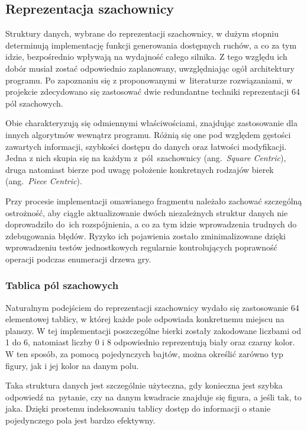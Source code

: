 \subsection{Reprezentacja szachownicy}
\label{subsec:reprezentacja-szachownicy}

Struktury danych, wybrane do reprezentacji szachownicy, w dużym stopniu determinują implementację funkcji generowania dostępnych ruchów, a co za tym idzie, bezpośrednio wpływają na wydajność całego silnika.
Z tego względu ich dobór musiał zostać odpowiednio zaplanowany, uwzględniając ogół architektury programu.
Po zapoznaniu się z proponowanymi w~literaturze rozwiązaniami, w projekcie zdecydowano się zastosować dwie redundantne techniki reprezentacji 64 pól szachowych.

Obie charakteryzują się odmiennymi właściwościami, znajdując zastosowanie dla innych algorytmów wewnątrz programu.
Różnią się one pod względem gęstości zawartych informacji, szybkości dostępu do danych oraz łatwości modyfikacji.
Jedna z nich skupia się na każdym z~pól~szachownicy (ang.~\emph{Square Centric}), druga natomiast bierze pod uwagę położenie konkretnych rodzajów bierek (ang.~\emph{Piece Centric}).

Przy procesie implementacji omawianego fragmentu należało zachować szczególną ostrożność, aby ciągłe aktualizowanie dwóch niezależnych struktur danych nie doprowadziło do~ich rozspójnienia, a co za tym idzie wprowadzenia trudnych do zdebugowania błędów.
Ryzyko ich pojawienia zostało zminimalizowane dzięki wprowadzeniu testów jednostkowych regularnie kontrolujących poprawność operacji podczas enumeracji drzewa gry.
\subsubsection{Tablica pól szachowych}

Naturalnym podejściem do reprezentacji szachownicy wydało się zastosowanie 64 elementowej tablicy, w której każde pole odpowiada konkretnemu miejscu na planszy.
W tej implementacji poszczególne bierki zostały zakodowane liczbami od 1 do 6, natomiast liczby 0 i 8 odpowiednio reprezentują biały oraz czarny kolor.
W ten sposób, za pomocą pojedynczych bajtów, można określić zarówno typ figury, jak i jej kolor na danym polu.

Taka struktura danych jest szczególnie użyteczna, gdy konieczna jest szybka odpowiedź na~pytanie, czy na danym kwadracie znajduje się figura, a jeśli tak, to jaka.
Dzięki prostemu indeksowaniu tablicy dostęp do informacji o stanie pojedynczego pola jest bardzo efektywny.

